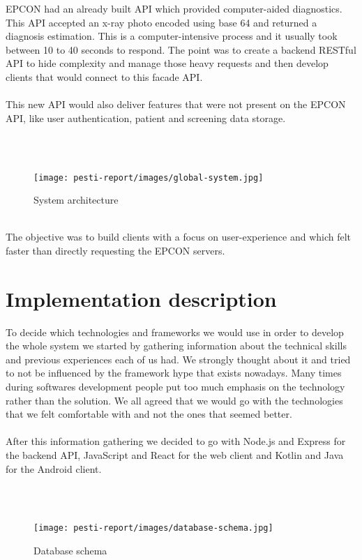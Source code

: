 
EPCON had an already built API which provided computer-aided diagnostics. This API accepted an x-ray photo encoded using base 64 and returned a diagnosis estimation. This is a computer-intensive process and it usually took between 10 to 40 seconds to respond. The point was to create a backend RESTful API to hide complexity and manage those heavy requests and then develop clients that would connect to this facade API.
\\ \\
This new API would also deliver features that were not present on the EPCON API, like user authentication, patient and screening data storage.

\\ \\
\begin{figure}[!h]
	\centering
	\texttt{[image: pesti-report/images/global-system.jpg]}
	\caption{System architecture}
	\label{fig:global-system}
\end{figure}
\\

The objective was to build clients with a focus on user-experience and which felt faster than directly requesting the EPCON servers.

\section{Implementation description}

To decide which technologies and frameworks we would use in order to develop the whole system we started by gathering information about the technical skills and previous experiences each of us had. We strongly thought about it and tried to not be influenced by the framework hype that exists nowadays. Many times during softwares development people put too much emphasis on the technology rather than the solution. We all agreed that we would go with the technologies that we felt comfortable with and not the ones that seemed better.
\\ \\
After this information gathering we decided to go with Node.js and Express for the backend API, JavaScript and React for the web client and Kotlin and Java for the Android client.

\\ \\
\begin{figure}[!h]
	\centering
	\texttt{[image: pesti-report/images/database-schema.jpg]}
	\caption{Database schema}
	\label{fig:database-schema}
\end{figure}
\\


